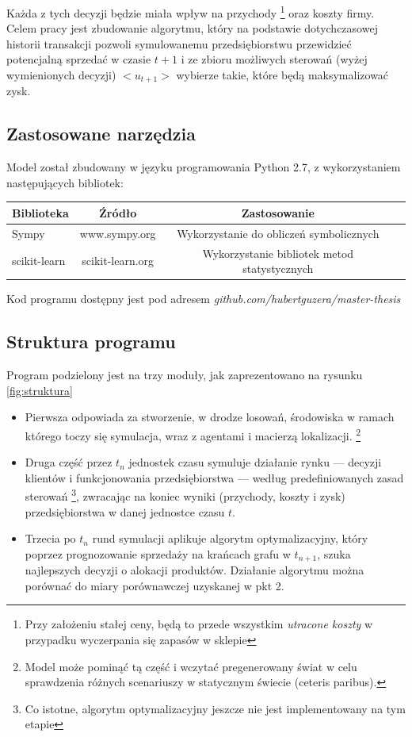 \documentclass[polish, twoside, 12pt, a4paper]{article}
\theoremstyle{definition}
\theoremstyle{plain}
\theoremstyle{remark}
\begin{document}
Każda z tych decyzji będzie miała wpływ na przychody \footnote{Przy założeniu stałej ceny, będą to przede wszystkim \textit{utracone koszty} w przypadku wyczerpania się zapasów w sklepie} oraz koszty firmy. Celem pracy jest zbudowanie algorytmu, który na podstawie dotychczasowej historii transakcji pozwoli symulowanemu przedsiębiorstwu przewidzieć potencjalną sprzedać w czasie $ t +1 $ i ze zbioru możliwych sterowań (wyżej wymienionych decyzji) $<u_{t+1}>$ wybierze takie, które będą maksymalizować zysk. 

\subsection{Zastosowane narzędzia}

Model został zbudowany w języku programowania Python 2.7, z wykorzystaniem następujących bibliotek: 

\begin{center}
\begin{tabular}{lccc}
 Biblioteka & Źródło & Zastosowanie \\ 
\hline
 Sympy & www.sympy.org & Wykorzystanie do obliczeń symbolicznych \\  
 scikit-learn & scikit-learn.org & Wykorzystanie bibliotek metod statystycznych \\ \hline
\end{tabular}
\end{center}

Kod programu dostępny jest pod adresem  \textit{github.com/hubertguzera/master-thesis}

\subsection{Struktura programu}

Program podzielony jest na trzy moduły, jak zaprezentowano na rysunku \ref{fig:struktura}

	\begin{itemize}
		\item Pierwsza odpowiada za stworzenie, w drodze losowań, środowiska w ramach którego toczy się symulacja, wraz z agentami i macierzą lokalizacji. \footnote{Model może pominąć tą część i wczytać pregenerowany świat w celu sprawdzenia różnych scenariuszy w statycznym świecie (ceteris paribus).}
		\item  Druga część przez $t_n$ jednostek czasu symuluje działanie rynku --- decyzji klientów i funkcjonowania przedsiębiorstwa --- według predefiniowanych zasad sterowań \footnote{Co istotne, algorytm optymalizacyjny jeszcze nie jest implementowany na tym etapie}, zwracając na koniec wyniki (przychody, koszty i zysk) przedsiębiorstwa w danej jednostce czasu $t$.
		\item Trzecia po $t_n$ rund symulacji aplikuje algorytm optymalizacyjny, który poprzez prognozowanie sprzedaży na krańcach grafu w $t_{n+1}$, szuka najlepszych decyzji o alokacji produktów. Działanie algorytmu można porównać do miary porównawczej uzyskanej w pkt 2. 
	\end{itemize}
\end{document}
